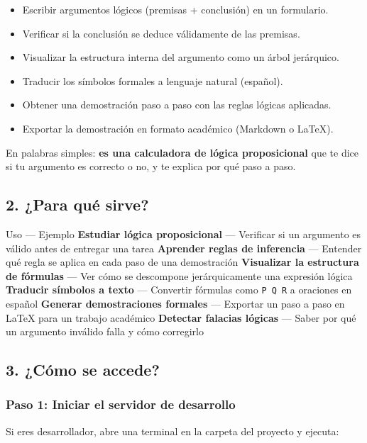 \documentclass[11pt,a4paper]{article}
\begin{document}
\begin{itemize}[leftmargin=*]
\item Escribir argumentos lógicos (premisas + conclusión) en un formulario.
\item Verificar si la conclusión se deduce válidamente de las premisas.
\item Visualizar la estructura interna del argumento como un árbol jerárquico.
\item Traducir los símbolos formales a lenguaje natural (español).
\item Obtener una demostración paso a paso con las reglas lógicas aplicadas.
\item Exportar la demostración en formato académico (Markdown o LaTeX).
\end{itemize}

En palabras simples: \textbf{es una calculadora de lógica proposicional} que te dice si tu argumento es correcto o no, y te explica por qué paso a paso.

\hrulefill

\subsection{2. ¿Para qué sirve?}

Uso --- Ejemplo
\textbf{Estudiar lógica proposicional} --- Verificar si un argumento es válido antes de entregar una tarea
\textbf{Aprender reglas de inferencia} --- Entender qué regla se aplica en cada paso de una demostración
\textbf{Visualizar la estructura de fórmulas} --- Ver cómo se descompone jerárquicamente una expresión lógica
\textbf{Traducir símbolos a texto} --- Convertir fórmulas como \texttt{P  Q  R} a oraciones en español
\textbf{Generar demostraciones formales} --- Exportar un paso a paso en LaTeX para un trabajo académico
\textbf{Detectar falacias lógicas} --- Saber por qué un argumento inválido falla y cómo corregirlo

\hrulefill

\subsection{3. ¿Cómo se accede?}

\subsubsection{Paso 1: Iniciar el servidor de desarrollo}

Si eres desarrollador, abre una terminal en la carpeta del proyecto y ejecuta:
\end{document}
